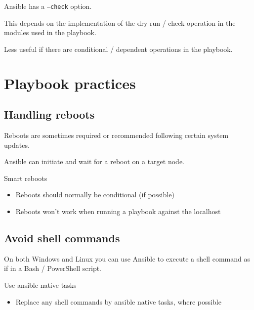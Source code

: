 \documentclass[slides]{pgnotes}
\begin{document}
Ansible has a \texttt{--check} option.

This depends on the implementation of the dry run / check operation in the modules used in the playbook.

Less useful if there are conditional / dependent operations in the playbook.


\section{Playbook practices}

\subsection{Handling reboots}

Reboots are sometimes required or recommended following certain system updates.

Ansible can initiate and wait for a reboot on a target node.

\begin{greenbox}{Smart reboots}
  \begin{itemize}
  \item Reboots should normally be conditional (if possible)
  \item Reboots won't work when running a playbook against the localhost
  \end{itemize}
\end{greenbox}


\subsection{Avoid shell commands}

On both Windows and Linux you can use Ansible to execute a shell command as if in a Bash / PowerShell script.

\begin{greenbox}{Use ansible native tasks}
  \begin{itemize}
  \item Replace any shell commands by ansible native tasks, where possible
  \end{itemize}
\end{greenbox}
\end{document}
